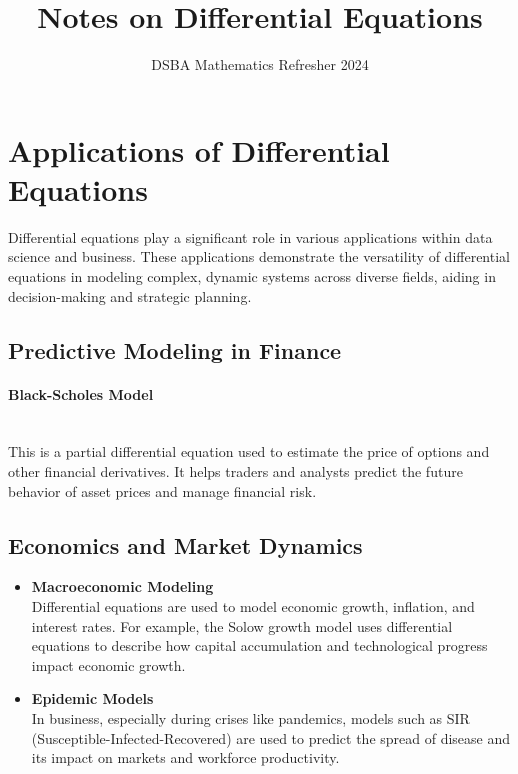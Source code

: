 \documentclass[]{article}
\title{Notes on Differential Equations}
\author{DSBA Mathematics Refresher 2024}
\date{}
\begin{document}
	
	\maketitle
	
	\begin{abstract}
		
	\end{abstract}
	
	\section{Applications of Differential Equations}
	Differential equations play a significant role in various applications within data science and business. These applications demonstrate the versatility of differential equations in modeling complex, dynamic systems across diverse fields, aiding in decision-making and strategic planning.
	\subsection{Predictive Modeling in Finance}
	\paragraph{Black-Scholes Model}\noindent\\
	This is a partial differential equation used to estimate the price of options and other financial derivatives.
	It helps traders and analysts predict the future behavior of asset prices and manage financial risk.
	\subsection{Economics and Market Dynamics}
	\begin{itemize}
		\item \textbf{Macroeconomic Modeling}\noindent\\
		Differential equations are used to model economic growth, inflation, and interest rates.
		For example, the Solow growth model uses differential equations to describe how capital accumulation and technological progress impact economic growth.
		\item \textbf{Epidemic Models}\\
		In business, especially during crises like pandemics, models such as SIR (Susceptible-Infected-Recovered) are used to predict the spread of disease and its impact on markets and workforce productivity.
	\end{itemize}
\end{document}
